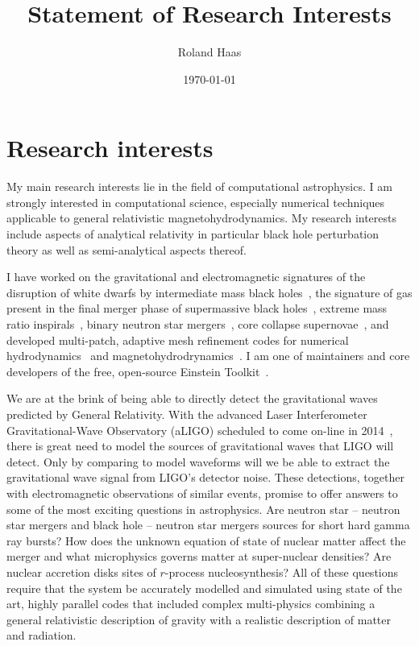 \documentclass[12pt]{article}
\newcommand{\aligo}{aLIGO}
\newcommand{\ligo}{LIGO}
\begin{document}
\title{Statement of Research Interests}
\author{Roland Haas}
\date{\today}
\maketitle

\section{Research interests}
My main research interests lie in the field of computational astrophysics.
I am strongly interested in computational science,
especially numerical techniques applicable to general relativistic
magnetohydrodynamics. 
My research interests
include aspects of analytical
relativity in particular black hole perturbation theory as well as
semi-analytical aspects thereof. 

I have worked on the gravitational and electromagnetic signatures of the
disruption of white dwarfs by intermediate mass black
holes~\cite{2012arXiv1212.4837S, 2012ApJ...749..117H},
the signature of gas present in the final merger phase of
supermassive black holes~\cite{2012ApJ...744...45B,2010ApJ...715.1117B}, extreme mass ratio
inspirals~\cite{2011arXiv1112.3707H,2007PhRvD..75l4011H,2006PhRvD..74d4009H,2005CQGra..22S.739H,2013PhRvD..87d1501Z},
binary neutron star mergers~\cite{Haas:nsns}, core
collapse supernovae~\cite{2012arXiv1210.6674O,2012PhRvD..86b4026O}, 
and developed multi-patch, adaptive mesh
refinement codes for
numerical hydrodynamics~\cite{2012arXiv1212.1191R} and
magnetohydrodrynamics~\cite{2013arXiv1304.5544M}. I am one of maintainers and
core developers of the free, open-source Einstein
Toolkit~\cite{2012CQGra..29k5001L}.

We are at the brink of being able to directly detect the gravitational waves
predicted by General Relativity. With the advanced Laser Interferometer
Gravitational-Wave Observatory (\aligo{}) scheduled to come
on-line in 2014~\cite{advLIGO:Web}, there is great need to model the sources of
gravitational waves that \ligo{} will detect. 
Only by comparing to model waveforms will we be able to extract the
gravitational wave signal from \ligo{'s} detector noise.
These detections, together with
electromagnetic observations of similar events, promise to offer answers to
some of the most exciting questions in astrophysics. Are neutron star --
neutron star mergers and black hole -- neutron star mergers sources for short
hard gamma ray bursts?  How does the unknown equation of state of nuclear
matter affect the merger and what microphysics governs matter at
super-nuclear densities? Are nuclear accretion disks sites of $r$-process
nucleosynthesis? All of these questions require that the system be accurately
modelled and simulated using state of the art, highly parallel codes that
included complex multi-physics combining a general relativistic description of
gravity with a realistic description of matter and radiation. 
\end{document}

